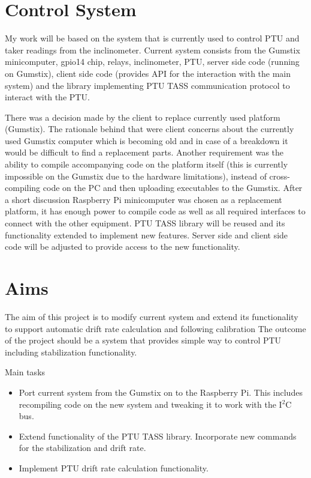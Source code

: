 \section{Control System}
My work will be based on the system that is currently used to control PTU and taker readings from the inclinometer. Current system consists from the Gumstix minicomputer, gpio14 chip, relays, inclinometer, PTU, server side code (running on Gumstix), client side code (provides API for the interaction with the main system) and the library implementing PTU TASS communication protocol to interact with the PTU.

There was a decision made by the client to replace currently used platform (Gumstix). The rationale behind that were client concerns about the currently used Gumstix computer which is becoming old and in case of a breakdown it would be difficult to find a replacement parts. Another requirement was the ability to compile accompanying code on the platform itself (this is currently impossible on the Gumstix due to the hardware limitations), instead of cross-compiling code on the PC and then uploading executables to the Gumstix. After a short discussion Raspberry Pi minicomputer was chosen as a replacement platform, it has enough power to compile code as well as all required interfaces to connect with the other equipment. PTU TASS library will be reused and its functionality extended to implement new features. Server side and client side code will be adjusted to provide access to the new functionality.

\section{Aims}
The aim of this project is to modify current system and extend its functionality to support automatic drift rate calculation and following calibration  The outcome of the project should be a system that provides simple way to control PTU including stabilization functionality.

Main tasks
\begin{itemize}
\item Port current system from the Gumstix on to the Raspberry Pi.
\subitem This includes recompiling code on the new system and tweaking it to work with the I$^2$C bus.
\item Extend functionality of the PTU TASS library.
\subitem Incorporate new commands for the stabilization and drift rate.
\item Implement PTU drift rate calculation functionality.
\end{itemize}  




